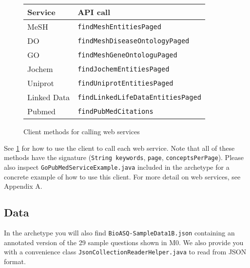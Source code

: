 \begin{figure}
\begin{tabular}{l|l}
\textbf{Service} & \textbf{API call}  \\\hline\hline
MeSH  & \small\verb|findMeshEntitiesPaged| \\ 
DO  & \small \verb|findMeshDiseaseOntologyPaged|  \\ 
GO  & \small\verb|findMeshGeneOntologuPaged|   \\ 
Jochem  &  \small\verb|findJochemEntitiesPaged|  \\ 
Uniprot  & \small\verb|findUniprotEntitiesPaged|  \\
Linked Data & \small\verb|findLinkedLifeDataEntitiesPaged| \\
Pubmed & \small\verb|findPubMedCitations| \\ 
\end{tabular}
\caption{Client methods for calling web services}
\label{fig:client}
\end{figure}
See \ref{fig:client} for how to use the client to call each web service. Note that all of these methods have the signature (\verb|String keywords|, \verb|page|, \verb|conceptsPerPage|).
Please also inspect \verb|GoPubMedServiceExample.java| included in the archetype for a concrete example of how to use this client.
For more detail on web services, see Appendix A.

\subsection{Data}
In the archetype you will also find \verb|BioASQ-SampleData1B.json| containing an annotated version of the 29 sample questions shown in M0. We also provide you with a convenience class \verb|JsonCollectionReaderHelper.java| to read from JSON format. 

